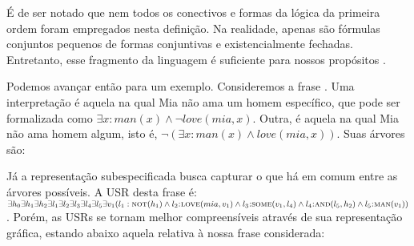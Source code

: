 É de ser notado que nem todos os conectivos e formas da lógica da primeira ordem foram empregados nesta definição. Na realidade, apenas são fórmulas conjuntos pequenos de formas conjuntivas e existencialmente fechadas. Entretanto, esse fragmento da linguagem é suficiente para nossos propósitos \citep[p.~131]{BlackburnBos:2005}.

Podemos avançar então para um exemplo. Consideremos a frase . Uma interpretação é aquela na qual Mia não ama um homem específico, que pode ser formalizada como $\exists x: man(x) \land \neg love(mia,x)$. Outra, é aquela na qual Mia não ama homem algum, isto é, $\neg (\exists x: man(x) \land love(mia,x))$. Suas árvores são:

\begin{center}
\end{center}

Já a representação subespecificada busca capturar o que há em comum entre as árvores possíveis. A USR desta frase é: $\exists h_0 \exists h_1 \exists h_2 \exists l_1 \exists l_2 \exists l_3 \exists l_4 \exists l_5 \exists v_1 ({l_1:\textsc{not}(h_1)} \land l_2\textsc{:love}(mia,v_1) \land l_3\textsc{:some}(v_1,l_4) \land l_4\textsc{:and}(l_5, h_2) \land l_5\textsc{:man}(v_1))$. Porém, as USRs se tornam melhor compreensíveis através de sua representação gráfica, estando abaixo aquela relativa à nossa frase considerada:

\begin{center}
\end{center}


